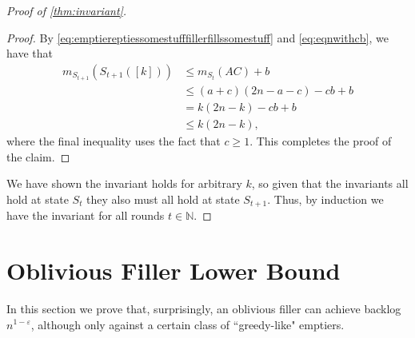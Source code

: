 \documentclass[twocolumn]{article}[10pt]
\begin{document}
\begin{proof}[Proof of \cref{thm:invariant}]
\begin{proof}
By \eqref{eq:emptiereptiessomestufffillerfillssomestuff} and \eqref{eq:eqnwithcb}, we have that
\begin{align*}
    m_{S_{t+1}}(S_{t + 1}([k])) & \le m_{S_t}(AC) + b \\
                                & \le (a+c)(2n-a-c) - cb + b \\
                                & = k(2n-k) - cb + b \\
                                & \le k(2n-k),
\end{align*}
where the final inequality uses the fact that $c \ge 1$. This completes the proof of the claim. 
  
\end{proof}

We have shown the invariant holds for arbitrary $k$, so given that the
invariants all hold at state $S_t$ they also must all hold at state $S_{t+1}$.
Thus, by induction we have the invariant for all rounds $t\in\mathbb{N}$.
\end{proof}



\section{Oblivious Filler Lower Bound}\label{sec:oblivious}
In this section we prove that, surprisingly, an oblivious filler
can achieve backlog $n^{1-\varepsilon}$, although only against a
certain class of ``greedy-like" emptiers.

\end{document}
